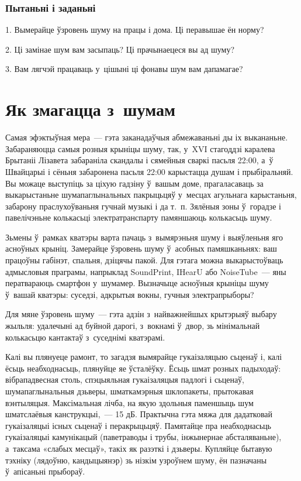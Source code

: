 \subsubsection{Пытаньні і заданьні}

1. Вымерайце ўзровень шуму на працы і дома. Ці перавышае ён норму?

2. Ці замінае шум вам засыпаць? Ці прачынаецеся вы ад шуму?

3. Вам лягчэй працаваць у~цішыні ці фонавы шум вам дапамагае?


\section{Як змагацца з~шумам}

Самая эфэктыўная мера~--- гэта заканадаўчыя абмежаваньні ды іх выкананьне. Забараняюцца самыя розныя крыніцы шуму, так, у~XVI стагоддзі каралева Брытаніі Лізавета забараніла скандалы і сямейныя сваркі пасьля 22:00, а~ў Швайцарыі і сёньня забаронена пасьля 22:00 карыстацца душам і прыбіральняй. Вы можаце выступіць за ціхую гадзіну ў~вашым доме, прагаласаваць за выкарыстаньне шумапаглынальных пакрыцьцяў у~месцах агульнага карыстаньня, забарону праслухоўваньня гучнай музыкі і да т.~п. Зялёныя зоны ў~горадзе і павелічэньне колькасьці электратранспарту памяншаюць колькасьць шуму.

Зьмены ў~рамках кватэры варта пачаць з~вымярэньня шуму і выяўленьня яго асноўных крыніц. Замерайце ўзровень шуму ў~асобных памяшканьнях: ваш працоўны габінэт, спальня, дзіцячы пакой. Для гэтага можна выкарыстоўваць адмысловыя праграмы, напрыклад SoundPrint, IHearU або NoiseTube~--- яны ператвараюць смартфон у~шумамер. Вызначыце асноўныя крыніцы шуму ў~вашай кватэры: суседзі, адкрытыя вокны, гучныя электрапрыборы?

Для мяне ўзровень шуму~--- гэта адзін з~найважнейшых крытэрыяў выбару жыльля: удалечыні ад буйной дарогі, з~вокнамі ў~двор, зь мінімальнай колькасьцю кантактаў з~суседнімі кватэрамі.

Калі вы плянуеце рамонт, то загадзя вымярайце гукаізаляцыю сьценаў і, калі ёсьць неабходнасьць, плянуйце яе ўсталёўку. Ёсьць шмат розных падыходаў: вібрападвесная столь, спэцыяльная гукаізаляцыя падлогі і сьценаў, шумапаглынальныя дзьверы, шматкамэрныя шклопакеты, прытокавая вэнтыляцыя. Максімальная лічба, на якую здольныя паменшыць шум шматслаёвыя канструкцыі,~--- 15 дБ. Практычна гэта мяжа для дадатковай гукаізаляцыі існых сьценаў і перакрыцьцяў. Памятайце пра неабходнасьць гукаізаляцыі камунікацый (паветраводы і трубы, інжынернае абсталяваньне), а~таксама «слабых месцаў», такіх як разэткі і дзьверы. Купляйце бытавую тэхніку (лядоўню, кандыцыянэр) зь нізкім узроўнем шуму, ён пазначаны ў~апісаньні прыбораў.

